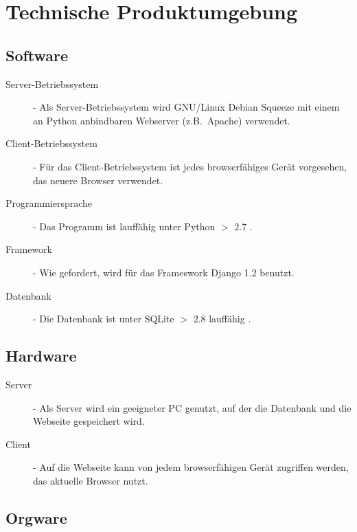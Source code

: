 
\chapter{Technische Produktumgebung}


\section{Software}


\begin{description}
\item [Server-Betriebssystem] - Als Server-Betriebssystem wird GNU/Linux Debian Squeeze mit einem an Python anbindbaren Webserver          (z.B.\ Apache) verwendet.																		
\item [Client-Betriebssystem] -               Für das Client-Betriebssystem ist jedes browserfähiges Gerät  vorgesehen, das neuere Browser	 verwendet. 																	
						
\item [Programmiersprache] -                 Das Programm  ist lauffähig unter Python $>$ 2.7 . 	
\item [Framework] -               Wie gefordert, wird für das Frameswork Django 1.2  benutzt.								
\item [Datenbank] - 	 Die Datenbank ist unter  SQLite $>$ 2.8  lauffähig .                                                                                
\end{description}



\section{Hardware}


\begin{description}
\item [Server] - Als Server wird ein geeigneter PC genutzt, auf der die Datenbank und die Webseite gespeichert wird.
\item [Client] - Auf die Webseite kann von jedem browserfähigen Gerät zugriffen werden, das aktuelle Browser nutzt. 
\end{description}

\section{Orgware}


